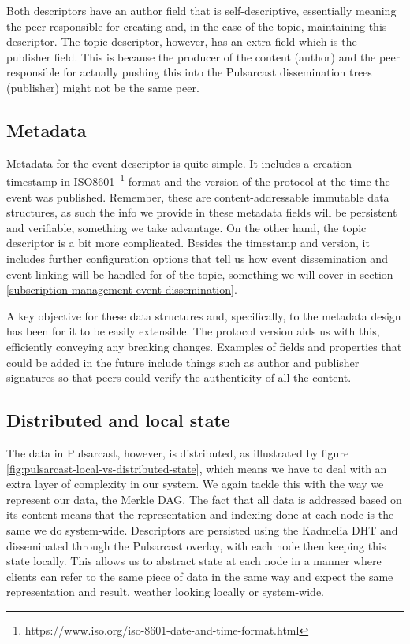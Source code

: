 Both descriptors have an author field that is self-descriptive, essentially
meaning the peer responsible for creating and, in the case of the topic,
maintaining this descriptor. The topic descriptor, however, has an extra field
which is the publisher field. This is because the producer of the content
(author) and the peer responsible for actually pushing this into the Pulsarcast
dissemination trees (publisher) might not be the same peer.

\subsection{Metadata}\label{subsec:metadata}

Metadata for the event descriptor is quite simple. It includes a creation
timestamp in
ISO8601~\footnote{https://www.iso.org/iso-8601-date-and-time-format.html}
format and the version of the protocol at the time the event was published.
Remember, these are content-addressable immutable data structures, as such the
info we provide in these metadata fields will be persistent and verifiable,
something we take advantage. On the other hand, the topic descriptor is a bit
more complicated. Besides the timestamp and version, it includes further
configuration options that tell us how event dissemination and event linking
will be handled for of the topic, something we will cover in section
\ref{subscription-management-event-dissemination}.

A key objective for these data structures and, specifically, to the metadata
design has been for it to be easily extensible. The protocol version aids us
with this, efficiently conveying any breaking changes. Examples of fields and
properties that could be added in the future include things such as author and
publisher signatures so that peers could verify the authenticity of all the
content.

\subsection{Distributed and local state}\label{subsec:distributed-and-local-state}

The data in Pulsarcast, however, is distributed, as illustrated by figure
\ref{fig:pulsarcast-local-vs-distributed-state}, which means we have to deal
with an extra layer of complexity in our system. We again tackle this with the
way we represent our data, the Merkle DAG. The fact that all data is addressed
based on its content means that the representation and indexing done at each
node is the same we do system-wide. Descriptors are persisted using the
Kadmelia DHT and disseminated through the Pulsarcast overlay, with each node
then keeping this state locally. This allows us to abstract state at each node
in a manner where clients can refer to the same piece of data in the same way
and expect the same representation and result, weather looking locally or
system-wide.

